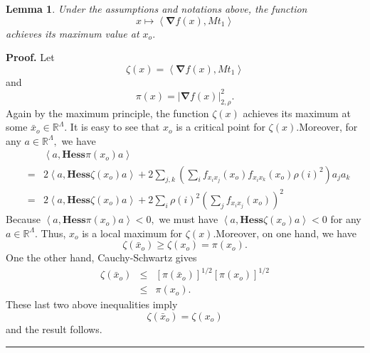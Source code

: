 \documentclass{article}
\newtheorem{lemma}[theorem]{Lemma}
\newenvironment{proof}[1][Proof]{\noindent\textbf{#1.} }{\ \rule{0.5em}{0.5em}}
\begin{document}
\begin{lemma}
\textit{Under the assumptions and notations above, the function }%
\begin{equation*}
x\longmapsto \left\langle \mathbf{\nabla }f(x),Mt_{1}\right\rangle
\end{equation*}%
\textit{achieves its maximum value at }$x_{o}.$
\end{lemma}

\begin{proof}
Let%
\begin{equation}
\zeta (x)=\left\langle \mathbf{\nabla }f(x),Mt_{1}\right\rangle
\end{equation}%
and 
\begin{equation}
\pi (x)=\left| \mathbf{\nabla }f(x)\right| _{2,\rho }^{2}.
\end{equation}%
Again by the maximum principle, the function $\zeta (x)$ achieves its
maximum at some $\bar{x}_{o}\in \mathbb{R}^{\Lambda }.$ It is easy to see
that $x_{o}$ is a critical point for $\zeta (x).$Moreover, for any $a\in 
\mathbb{R}^{\Lambda },$ we have%
\begin{eqnarray}
&&\left\langle a,\mathbf{Hess}\pi (x_{o})a\right\rangle \\
&=&2\left\langle a,\mathbf{Hess}\zeta (x_{o})a\right\rangle
+2\sum_{j,k}\left( \sum_{i}f_{x_{i}x_{j}}(x_{o})f_{x_{i}x_{k}}(x_{o})\rho
(i)^{2}\right) a_{j}a_{k} \\
&=&2\left\langle a,\mathbf{Hess}\zeta (x_{o})a\right\rangle +2\sum_{i}\rho
(i)^{2}\left( \sum_{j}f_{x_{i}x_{j}}(x_{o})\right) ^{2}
\end{eqnarray}%
Because $\left\langle a,\mathbf{Hess}\pi (x_{o})a\right\rangle <0,$ we must
have $\left\langle a,\mathbf{Hess}\zeta (x_{o})a\right\rangle <0$ for any $%
a\in \mathbb{R}^{\Lambda }.$ Thus, $x_{o}$ is a local maximum for $\zeta
(x). $Moreover, on one hand, we have 
\begin{equation}
\zeta (\bar{x}_{o})\geq \zeta (x_{o})=\pi (x_{o}).
\end{equation}%
One the other hand, Cauchy-Schwartz gives%
\begin{eqnarray}
\zeta (\bar{x}_{o}) &\leq &\left[ \pi (\bar{x}_{o})\right] ^{1/2}\left[ \pi
(x_{o})\right] ^{1/2} \\
&\leq &\pi (x_{o}).
\end{eqnarray}%
These last two above inequalities imply 
\begin{equation}
\zeta (\bar{x}_{o})=\zeta (x_{o})
\end{equation}%
and the result follows.
\end{proof}
\end{document}
